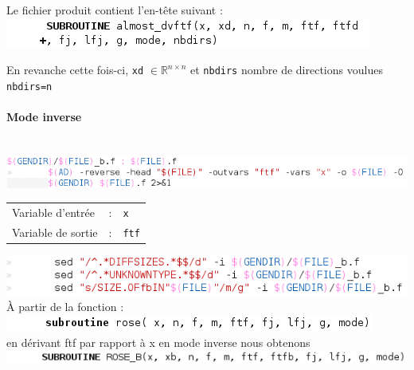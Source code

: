 Le fichier produit contient l'en-tête suivant :\\
\includegraphics[scale=0.7]{code/multient.png}

En revanche cette fois-ci, {\tt xd} $\in \mathbb{R}^{n\times n}$
et {\tt nbdirs} nombre de directions voulues {\tt nbdirs=n}


\paragraph{Mode inverse} \hfill \\

\includegraphics[scale=0.7]{code/inverse.png}\\
\begin{tabular}{lll}
Variable d'entrée&:& {\tt x} \\
Variable de sortie&:& {\tt ftf} \\
\end{tabular}

\includegraphics[scale=0.7]{code/inversetrans.png}\\

\`A partir de la fonction :\\
\includegraphics[scale=0.7]{code/entete.png}\\
en dérivant ftf par rapport à x en mode inverse nous obtenons\\
\includegraphics[scale=0.7]{code/inverseent.png}\\

